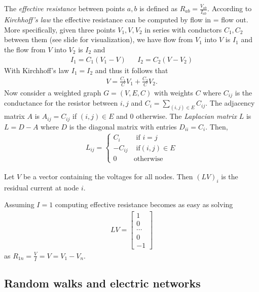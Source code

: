 The \emph{effective resistance} between points $a,b$ is defined as $R_{ab} = \frac{V_{ab}}{I_{ab}}$. According to \emph{Kirchhoff's law} the effective resistance can be computed by flow in = flow out. More specifically, given three points $V_1, V, V_2$ in series with conductors $C_1, C_2$ between them (see slide for visualization), we have flow from $V_1$ into $V$ is $I_1$  and the flow from $V$ into $V_2$ is $I_2$ and
\begin{align*}
    I_1 = C_1(V_1-V) && I_2 = C_2(V-V_2)
\end{align*}
With Kirchhoff's law $I_1 = I_2$ and thus it follows that
\begin{align*}
    V = \frac{C_1}{C} V_1 + \frac{C_2}{C} V_2.
\end{align*}
Now consider a weighted graph $G = (V,E,C)$ with weights $C$ where $C_{ij}$ is the conductance for the resistor between $i,j$ and $C_i = \sum_{(i,j) \in E} C_{ij}$. The adjacency matrix $A$ is $A_{ij} = C_{ij}$ if $(i,j) \in E$ and 0 otherwise. The \emph{Laplacian matrix} $L$ is $L = D - A$ where $D$ is the diagonal matrix with entries $D_{ii} = C_i$. Then,
\begin{align*}
    L_{ij} =
        \begin{cases}
            C_i & \text{ if } i=j\\
            -C_{ij} & \text{ if} (i,j) \in E\\
            0 & \text{otherwise}
        \end{cases}
\end{align*}
\begin{lemma}
Let $V$ be a vector containing the voltages for all nodes. Then $(LV)_i$ is the residual current at node $i$.
\end{lemma}
\noindent Assuming $I=1$ computing effective resistance becomes as easy as solving
\begin{align*}
    LV =
        \begin{bmatrix}
            1 \\
            0 \\
            \cdots \\
            0 \\
            -1
        \end{bmatrix}
\end{align*}
as $R_{1n} = \frac{V}{I} = V = V_1 - V_n$.

\subsection{Random walks and electric networks}
\bigskip

